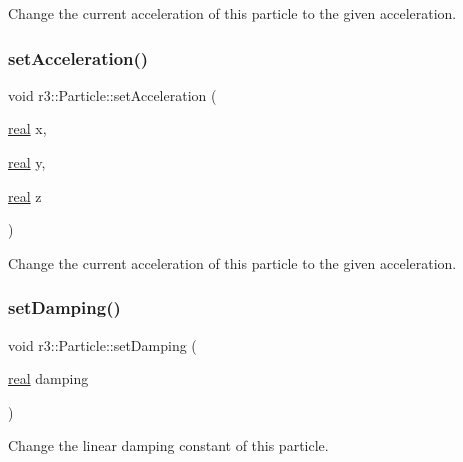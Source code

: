Change the current acceleration of this particle to the given acceleration. \mbox{\label{classr3_1_1_particle_a4043de464de32d14d8db0f676f63da75}} 
\subsubsection{\texorpdfstring{set\+Acceleration()}{setAcceleration()}\hspace{0.1cm}{\footnotesize\ttfamily [2/2]}}
{\footnotesize\ttfamily void r3\+::\+Particle\+::set\+Acceleration (\begin{DoxyParamCaption}\item[{\mbox{\hyperlink{namespacer3_ab2016b3e3f743fb735afce242f0dc1eb}{real}}}]{x,  }\item[{\mbox{\hyperlink{namespacer3_ab2016b3e3f743fb735afce242f0dc1eb}{real}}}]{y,  }\item[{\mbox{\hyperlink{namespacer3_ab2016b3e3f743fb735afce242f0dc1eb}{real}}}]{z }\end{DoxyParamCaption})}

Change the current acceleration of this particle to the given acceleration. \mbox{\label{classr3_1_1_particle_a5a7d9ff7821fd5755317ec877f66e8f6}} 
\subsubsection{\texorpdfstring{set\+Damping()}{setDamping()}}
{\footnotesize\ttfamily void r3\+::\+Particle\+::set\+Damping (\begin{DoxyParamCaption}\item[{\mbox{\hyperlink{namespacer3_ab2016b3e3f743fb735afce242f0dc1eb}{real}}}]{damping }\end{DoxyParamCaption})}

Change the linear damping constant of this particle. \mbox{\label{classr3_1_1_particle_a6219cdcf36221881e92fbe548a682bed}} 
